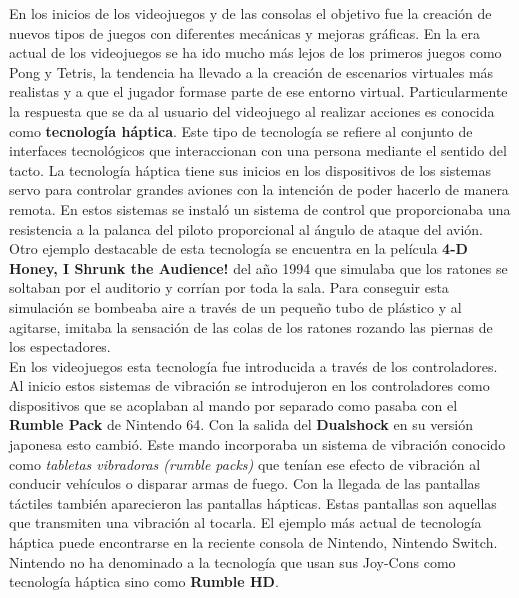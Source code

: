 En los inicios de los videojuegos y de las consolas el objetivo fue la creaci\'on de nuevos tipos de juegos con diferentes mec\'anicas y mejoras gr\'aficas. En la era actual de los videojuegos se ha ido mucho m\'as lejos de los primeros juegos como Pong y Tetris, la tendencia ha llevado a la creaci\'on de escenarios virtuales m\'as realistas y a que el jugador formase parte de ese entorno virtual. Particularmente la respuesta que se da al usuario del videojuego al realizar acciones es conocida como \textbf{tecnolog\'ia h\'aptica}. Este tipo de tecnolog\'ia se refiere al conjunto de interfaces tecnol\'ogicos que interaccionan con una persona mediante el sentido del tacto. La tecnolog\'ia h\'aptica tiene sus inicios en los dispositivos de los sistemas servo para controlar grandes aviones con la intenci\'on de poder hacerlo de manera remota. En estos sistemas se instal\'o un sistema de control que proporcionaba una resistencia a la palanca del piloto proporcional al \'angulo de ataque del avi\'on. Otro ejemplo destacable de esta tecnolog\'ia se encuentra en la pel\'icula \textbf{4-D Honey, I Shrunk the Audience!} del a\~no 1994 que simulaba que los ratones se soltaban por el auditorio y corr\'ian por toda la sala. Para conseguir esta simulaci\'on se bombeaba aire a trav\'es de un peque\~no tubo de pl\'astico y al agitarse, imitaba la sensaci\'on de las colas de los ratones rozando las piernas de los espectadores. \\

En los videojuegos esta tecnolog\'ia fue introducida a trav\'es de los controladores. Al inicio estos sistemas de vibraci\'on se introdujeron en los controladores como dispositivos que se acoplaban al mando por separado como pasaba con el \textbf{Rumble Pack} de Nintendo 64. Con la salida del \textbf{Dualshock} en su versi\'on japonesa esto cambi\'o. Este mando incorporaba un sistema de vibraci\'on conocido como \textit{tabletas vibradoras (rumble packs)} que ten\'ian ese efecto de vibraci\'on al conducir veh\'iculos o disparar armas de fuego. Con la llegada de las pantallas t\'actiles tambi\'en aparecieron las pantallas h\'apticas. Estas pantallas son aquellas que transmiten una vibraci\'on al tocarla. El ejemplo m\'as actual de tecnolog\'ia h\'aptica puede encontrarse en la reciente consola de Nintendo, Nintendo Switch. Nintendo no ha denominado a la tecnolog\'ia que usan sus Joy-Cons como tecnolog\'ia h\'aptica sino como \textbf{Rumble HD}. \\

